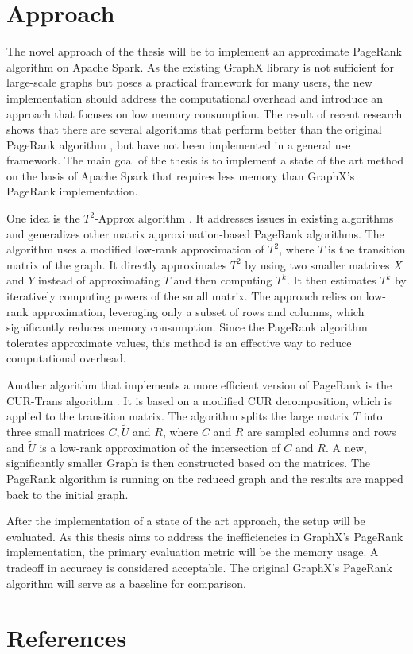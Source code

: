 \documentclass[a4paper,12pt]{article}
\begin{document}
\section{Approach}
The novel approach of the thesis will be to implement an approximate PageRank algorithm on Apache Spark. As the existing GraphX library is not sufficient for large-scale graphs but poses a practical framework for many users, the new implementation should address the computational overhead and introduce an approach that focuses on low memory consumption. 
The result of recent research shows that there are several algorithms that perform better than the original PageRank algorithm \cite{wu_efficient_2024}, but have not been implemented in a general use framework. The main goal of the thesis is to implement a state of the art method on the basis of Apache Spark that requires less memory than GraphX's PageRank implementation. 

One idea is the $T^2$-Approx algorithm \cite{wu_efficient_2024}. It addresses issues in existing algorithms and generalizes other matrix approximation-based PageRank algorithms. The algorithm uses a modified low-rank approximation of $T^2$, where $T$ is the transition matrix of the graph. It directly approximates $T^2$ by using two smaller matrices $X$ and $Y$ instead of approximating $T$ and then computing $T^k$. It then estimates $T^k$ by iteratively computing powers of the small matrix. The approach relies on low-rank approximation, leveraging only a subset of rows and columns, which significantly reduces memory consumption. Since the PageRank algorithm tolerates approximate values, this method is an effective way to reduce computational overhead.

Another algorithm that implements a more efficient version of PageRank is the CUR-Trans algorithm \cite{wu_efficient_2024}. It is based on a modified CUR decomposition, which is applied to the transition matrix. The algorithm splits the large matrix $T$ into three small matrices $C, \tilde{U}$ and $R$, where $C$ and $R$ are sampled columns and rows and $\tilde{U}$ is a low-rank approximation of the intersection of $C$ and $R$. A new, significantly smaller Graph is then constructed based on the matrices. The PageRank algorithm is running on the reduced graph and the results are mapped back to the initial graph.

After the implementation of a state of the art approach, the setup will be evaluated. As this thesis aims to address the inefficiencies in GraphX's PageRank implementation, the primary evaluation metric will be the memory usage. A tradeoff in accuracy is considered acceptable. The original GraphX's PageRank algorithm will serve as a baseline for comparison. 



\section{References}

\end{document}
